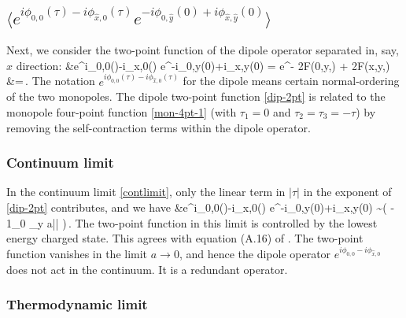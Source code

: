 \documentclass[12pt]{article}
\numberwithin{equation}{section}
\begin{document}
\subsection{$\langle e^{i\phi_{0,0}(\tau)-i\phi_{\hat x,0}(\tau)} e^{-i\phi_{0,\hat y}(0)+i\phi_{\hat x,\hat y}(0)} \rangle$}\label{sec:dipole}

Next, we consider the two-point function of the dipole operator  separated in, say, $x$ direction:
\ie\label{dip-2pt}
&\langle e^{i\phi_{0,0}(\tau)-i\phi_{\hat x,0}(\tau)} e^{-i\phi_{0,\hat y}(0)+i\phi_{\hat x,\hat y}(0)} \rangle = e^{- 2F(0,\hat y,\tau) + 2F(\hat x,\hat y,\tau)}\\
&=\exp{}\,.
\fe
The notation $e^{i\phi_{0,0}(\tau)-i\phi_{\hat x,0}(\tau)}$ for the dipole means certain normal-ordering  of the two monopoles.
The dipole two-point function \eqref{dip-2pt} is related to the monopole four-point function \eqref{mon-4pt-1} (with $\tau_1 = 0$ and $\tau_2 = \tau_3 = -\tau$) by removing the self-contraction terms within the dipole operator.


\subsubsection{Continuum limit}

In the continuum limit \eqref{contlimit}, only the linear term in $|\tau|$ in the exponent of \eqref{dip-2pt} contributes, and we have
\ie\label{eq:dipole2pt_conti}
&\langle e^{i\phi_{0,0}(\tau)-i\phi_{\hat x,0}(\tau)} e^{-i\phi_{0,\hat y}(0)+i\phi_{\hat x,\hat y}(0)} \rangle
\sim \exp\left(
- {1\over \mu_0 \ell_y a}|\tau|
\right)\,.
\fe
The two-point function in this limit is controlled by the lowest energy charged state.
 This agrees with equation (A.16) of \cite{paper1}.
The two-point function vanishes in the limit $a\to0$, and hence the dipole operator $e^{i\phi_{0,0}-i\phi_{\hat x,0}}$ does not act in the continuum.  It is a redundant operator.



\subsubsection{Thermodynamic limit}\label{sec:dipolethermo}
\end{document}
